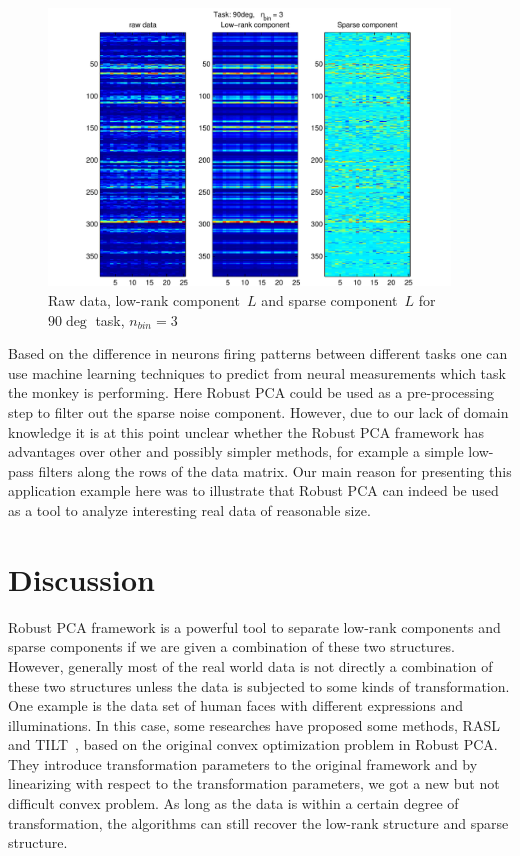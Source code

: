 \begin{figure}[h]
\centering
\includegraphics[width=0.95\textwidth]{../figures/BMI_comparison_90deg_3bins}
\caption{Raw data, low-rank component~$L$ and sparse component~$L$ for $90\deg$ task, $n_{bin}=3$}
\label{Applications:RPCAapps:BMI:comparison90deg}
\end{figure}

Based on the difference in neurons firing patterns between different tasks one can use machine learning techniques to predict from neural measurements which task the monkey is performing. Here Robust PCA could be used as a pre-processing step to filter out the sparse noise component. However, due to our lack of domain knowledge it is at this point unclear whether the Robust PCA framework has advantages over other and possibly simpler methods, for example a simple low-pass filters along the rows of the data matrix. Our main reason for presenting this application example here was to illustrate that Robust PCA can indeed be used as a tool to analyze interesting real data of reasonable size. 







\section{Discussion}
Robust PCA framework is a powerful tool to separate low-rank components and sparse components if we are given a combination of these two structures. However, generally most of the real world data is not directly a combination of these two structures unless the data is subjected to some kinds of transformation. One example is the data set of human faces with different expressions and illuminations. In this case, some researches have proposed some methods, RASL~\cite{Peng:2010} and TILT~\cite{Zhang:2011}, based on the original convex optimization problem in Robust PCA. They introduce transformation parameters to the original framework and by linearizing with respect to the transformation parameters, we got a new but not difficult convex problem. As long as the data is within a certain degree of transformation, the algorithms can still recover the low-rank structure and sparse structure.

